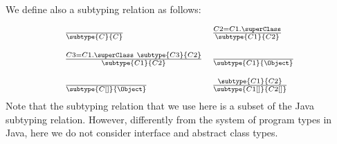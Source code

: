 We define also a subtyping relation as follows:

$$\begin{array}{ll}
  \frac{}{ \subtype{C}{C}} &  
  \frac{   C2 = C1.\superClass  }{\subtype{C1}{C2}} \\  
  & \\
  \frac{ C3 = C1.\superClass \   \subtype{C3}{C2} }{ \subtype{C1}{C2} } &
  \frac{}{  \subtype{C1}{\Object}} \\
  & \\
  \frac{   }{\subtype{C[]}{\Object}} &  
  \frac{ \subtype{C1}{C2}}{\subtype{C1[]}{C2[]}} \\
  \end{array}$$
Note that the subtyping relation that we use here is a subset of the Java subtyping relation. However, 
differently from the system of program types in Java, here we do not consider
 interface and abstract class types.
